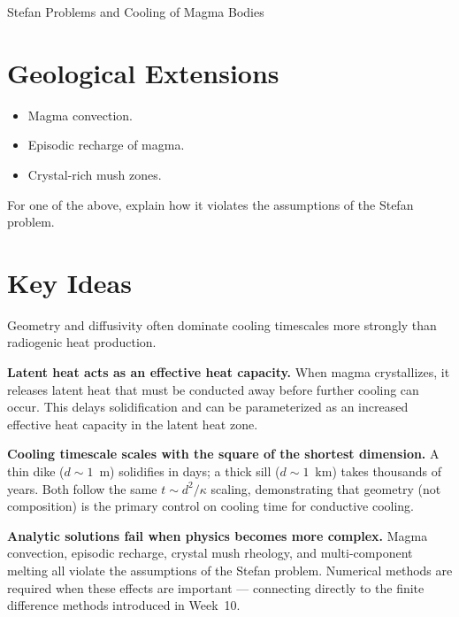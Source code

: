 \begin{activity}{Stefan Problems and Cooling of Magma Bodies}
\section*{Geological Extensions}
\begin{itemize}
  \item Magma convection.
  \item Episodic recharge of magma.
  \item Crystal-rich mush zones.
\end{itemize}
For one of the above, explain how it violates the assumptions of the Stefan problem.
\answerbox[3cm]

{\color{red}
\section*{Key Ideas}

Geometry and diffusivity often dominate cooling timescales more strongly than radiogenic heat production.

\textbf{Latent heat acts as an effective heat capacity.} When magma crystallizes, it releases latent heat that must be conducted away before further cooling can occur. This delays solidification and can be parameterized as an increased effective heat capacity in the latent heat zone.

\textbf{Cooling timescale scales with the square of the shortest dimension.} A thin dike ($d \sim 1$~m) solidifies in days; a thick sill ($d \sim 1$~km) takes thousands of years. Both follow the same $t \sim d^2/\kappa$ scaling, demonstrating that geometry (not composition) is the primary control on cooling time for conductive cooling.

\textbf{Analytic solutions fail when physics becomes more complex.} Magma convection, episodic recharge, crystal mush rheology, and multi-component melting all violate the assumptions of the Stefan problem. Numerical methods are required when these effects are important --- connecting directly to the finite difference methods introduced in Week~10.
}

\end{activity}